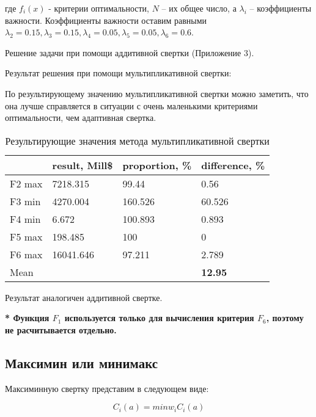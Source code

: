 где $f_i(x)$ - критерии оптимальности, $N$ – их общее число, а $\lambda_i$ -- коэффициенты важности. Коэффициенты важности оставим равными $\lambda_2=0.15, \lambda_3=0.15, \lambda_4=0.05, \lambda_5=0.05, \lambda_6=0.6$.

Решение задачи при помощи аддитивной свертки (Приложение 3).

Результат решения при помощи мультипликативной свертки:



По результирующему значению мультипликативной свертки можно заметить, что она лучше справляется в ситуации с очень маленькими критериями оптимальности, чем адаптивная свертка.

\begin{table}[h!]
	\centering
	\bgroup
	\captionsetup{singlelinecheck = false, format= hang, justification=raggedleft, font=footnotesize, labelsep=space}
	\caption{Результирующие значения метода мультипликативной свертки}
	\def\arraystretch{1}
	\begin{tabular}{ | m{1.5cm} | m{1.9cm} | m{2.2cm} | m{2.2cm} | }
		\hline
		& result, Mill\$ & proportion, \% & difference, \% \\ \hline
		F2 max & 7218.315 & 99.44 & 0.56 \\ \hline
		F3 min & 4270.004 & 160.526 & 60.526 \\ \hline
		F4 min & 6.672 & 100.893 & 0.893 \\ \hline
		F5 max & 198.485 & 100 & 0 \\ \hline
		F6 max & 16041.646 & 97.211 & 2.789 \\ \hline
		Mean & & & \textbf{12.95} \\
		\hline
	\end{tabular}
	\egroup
\end{table}

Результат аналогичен аддитивной свертке.

\textbf{* Функция $F_1$ используется только для вычисления критерия $F_6$, поэтому не расчитывается отдельно.}

\subsection{Максимин или минимакс}

Максиминную свертку представим в следующем виде:

\begin{equation*}
\text{$C_i(a)=min w_iC_i(a)$}
\end{equation*}

